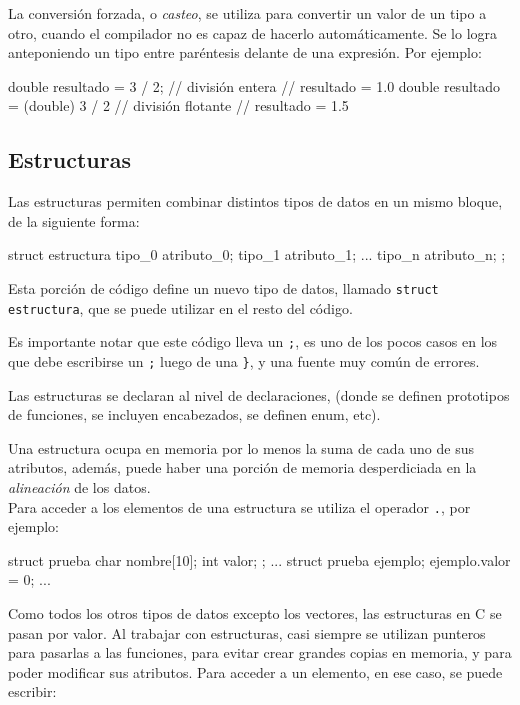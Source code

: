 La conversión forzada, o \textit{casteo}, se utiliza para convertir un valor
de un tipo a otro, cuando el compilador no es capaz de hacerlo
automáticamente.  Se lo logra anteponiendo un tipo entre paréntesis delante de
una expresión. Por ejemplo:

\begin{codigo-c-plano}
double resultado = 3 / 2; // división entera
                          // resultado = 1.0
double resultado = (double) 3 / 2 // división flotante
                                  // resultado = 1.5
\end{codigo-c-plano}

\subsection{Estructuras}

Las estructuras permiten combinar distintos tipos de datos en un mismo bloque,
de la siguiente forma:

\begin{codigo-c-plano}
struct estructura {
    tipo_0 atributo_0;
    tipo_1 atributo_1;
    ...
    tipo_n atributo_n;
};
\end{codigo-c-plano}

Esta porción de código define un nuevo tipo de datos, llamado
\lstinline!struct estructura!, que se puede utilizar en el resto del
código.

Es importante notar que este código lleva un \lstinline!;!, es uno de los
pocos casos en los que debe escribirse un \lstinline!;! luego de una
\lstinline!}!, y una fuente muy común de errores.

Las estructuras se declaran al nivel de declaraciones, (donde se
definen prototipos de funciones, se incluyen encabezados, se definen enum,
etc).

Una estructura ocupa en memoria por lo menos la suma de cada uno de sus
atributos, además, puede haber una porción de memoria desperdiciada en la
\textit{alineación} de los datos. \\

Para acceder a los elementos de una estructura se utiliza el operador
\lstinline!.!, por ejemplo:

\begin{codigo-c-plano}
struct prueba {
    char nombre[10];
    int valor;
};
...
    struct prueba ejemplo;
    ejemplo.valor = 0;
...
\end{codigo-c-plano}

Como todos los otros tipos de datos excepto los vectores, las estructuras en C
se pasan por valor. Al trabajar con estructuras, casi siempre se utilizan
punteros para pasarlas a las funciones, para evitar crear grandes copias en
memoria, y para poder modificar sus atributos.  Para acceder a un elemento, en
ese caso, se puede escribir:

